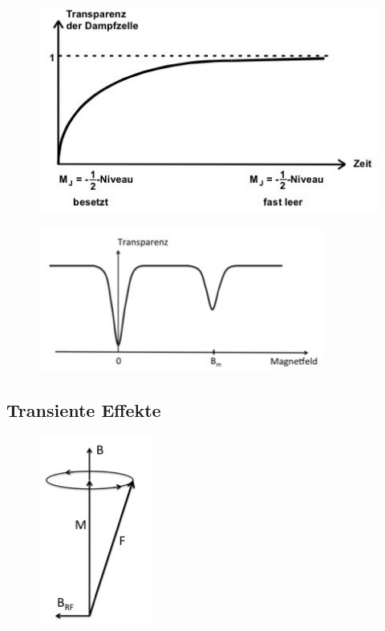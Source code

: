\begin{figure}[H]
	\centering
	\includegraphics[width=0.6\linewidth]{content/grafik/transparenz.jpg}
	\caption{\cite{pumpen}}
	\label{fig:transparenz}
\end{figure}

\begin{figure}[H]
	\centering
	\includegraphics[width=0.6\linewidth]{content/grafik/minima.jpg}
	\caption{\cite{pumpen}}
	\label{fig:minima}
\end{figure}

\subsection{Transiente Effekte}

\begin{figure}[H]
	\centering
	\includegraphics[width=0.2\linewidth]{content/grafik/praezession.jpg}
	\caption{\cite{pumpen}}
	\label{fig:praezession}
\end{figure}

